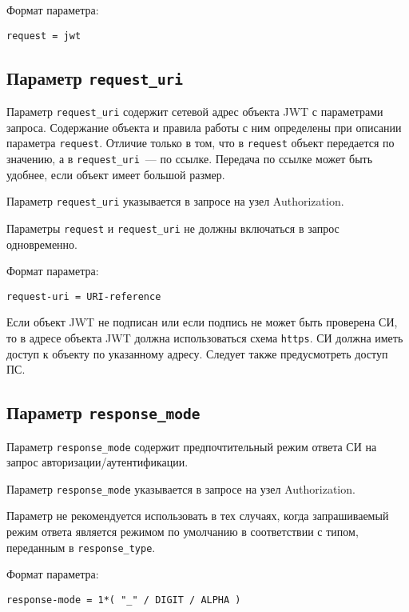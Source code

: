 Формат параметра:
\begin{lstlisting}
request = jwt
\end{lstlisting}

\subsection{Параметр \lstinline{request_uri}}\label{PARAMS.RequestUri} 

Параметр \lstinline{request_uri} содержит сетевой адрес объекта JWT с параметрами 
запроса. Содержание объекта и правила работы с ним определены при описании
параметра \lstinline{request}. Отличие только в том, что в \lstinline{request}
объект передается по значению, а в \lstinline{request_uri}~--- по ссылке.
%
Передача по ссылке может быть удобнее, если объект имеет большой размер.

Параметр \lstinline{request_uri} указывается в запросе на узел Authorization.

Параметры \lstinline{request} и \lstinline{request_uri} не должны включаться в 
запрос одновременно. 

Формат параметра:
\begin{lstlisting}
request-uri = URI-reference
\end{lstlisting}

Если объект JWT не подписан или если подпись не может быть проверена СИ, 
то в адресе объекта JWT должна использоваться схема \lstinline{https}.
%
СИ должна иметь доступ к объекту по указанному адресу.
%
Следует также предусмотреть доступ ПС.

\subsection{Параметр \lstinline{response_mode}}\label{PARAMS.RespMode} 

Параметр \lstinline{response_mode} содержит предпочтительный режим ответа СИ на 
запрос авторизации/аутентификации.

Параметр \lstinline{response_mode} указывается в запросе на узел Authorization.

Параметр не рекомендуется использовать в тех случаях, когда запрашиваемый 
режим ответа является режимом по умолчанию в соответствии с типом, переданным
в \lstinline{response_type}. 
%

Формат параметра:
\begin{lstlisting}
response-mode = 1*( "_" / DIGIT / ALPHA )
\end{lstlisting}

